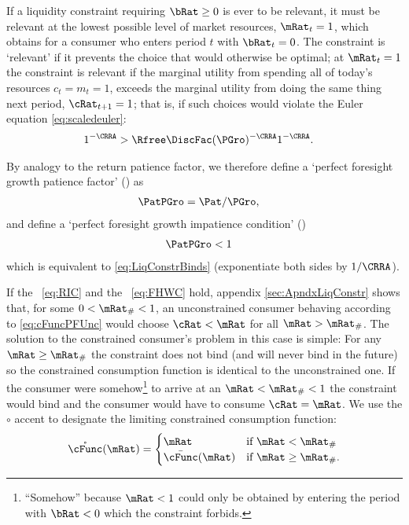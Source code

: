 \documentclass[BufferStockTheory]{subfiles}
\begin{document}
If a liquidity constraint requiring $\bRat \geq 0$ is ever to be relevant, it must be
relevant at the lowest possible level of market resources,
$\mRat_{t}=1$, which obtains for a consumer who enters period $t$ with
$\bRat_{t}=0$.  The constraint is `relevant' if
it prevents the choice that would otherwise be optimal; at
$\mRat_{t}=1$ the constraint is relevant if the marginal utility from spending all of today's
resources $c_{t}=m_{t}=1$, exceeds the marginal utility from
doing the same thing next period, $\cRat_{t+1}=1$; that is, if such
choices would violate the Euler equation \eqref{eq:scaledeuler}:
\begin{align}
  1^{-\CRRA}  & > \Rfree \DiscFac (\PGro)^{-\CRRA}1^{-\CRRA}  \label{eq:LiqConstrBinds}.
\end{align}

\hypertarget{PFGPF}{}
\hypertarget{PFGIC}{}
By analogy to the return patience factor, we therefore define a `perfect
foresight growth patience factor' (\PFGPF) as
\begin{align}
  \PatPGro  & = {\Pat}/\PGro,  \label{eq:PFGPF}
\end{align}
and define a `perfect foresight growth impatience condition' (\PFGIC)
\begin{align}
  \label{eq:PFGIC}
  \PatPGro &  < 1
\end{align}
which is equivalent to \eqref{eq:LiqConstrBinds} (exponentiate both
sides by $1/\CRRA$).

If the \RIC~\eqref{eq:RIC} and the \FHWC~\eqref{eq:FHWC} hold, appendix \ref{sec:ApndxLiqConstr} shows
that, for some $0 < \mRat_{\#} < 1$, an unconstrained consumer behaving according to
\eqref{eq:cFuncPFUnc} would choose $\cRat < \mRat$ for all $\mRat >
\mRat_{\#}$.  The solution to the
constrained consumer's problem in this case is simple: For any $\mRat
\geq \mRat_{\#}$ the constraint does not bind (and will never bind in
the future) so the constrained consumption function is identical
to the unconstrained one.  If the consumer were somehow\footnote{``Somehow'' because $\mRat<1$ could only be
  obtained by entering the period with $\bRat < 0$ which the constraint
  forbids.}
to arrive at an $\mRat < \mRat_{\#} < 1$ the constraint would bind and
the consumer would have to consume $\cRat=\mRat$.  We use the $\circ$ accent to designate the limiting
constrained consumption function:
\begin{equation}
  \mathring{\cFunc}(\mRat)=
  \begin{cases}
    \mRat & \text{if $\mRat < \mRat_{\#}$} \\
    \bar{\cFunc}(\mRat)  & \text{if $\mRat \geq \mRat_{\#}$.}
  \end{cases}
\end{equation}
\end{document}
